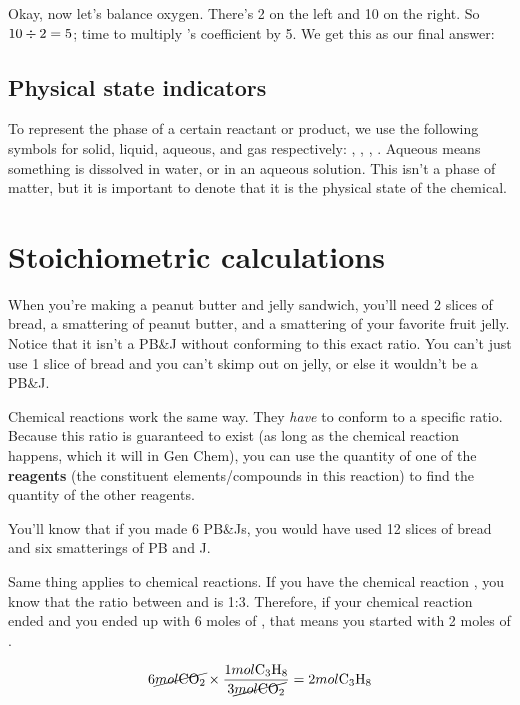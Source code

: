 \documentclass[letterpaper, 12pt]{article}
\begin{document}

Okay, now let's balance oxygen. There's 2 on the left and 10 on the right. So $10 \divisionsymbol 2 = 5$; time to multiply 's coefficient by 5. We get this as our final answer:


	\subsection{Physical state indicators}
	To represent the phase of a certain reactant or product, we use the following symbols for solid, liquid, aqueous, and gas respectively: , , , . Aqueous means something is dissolved in water, or in an aqueous solution. This isn't a phase of matter, but it is important to denote that it is the physical state of the chemical.

\section{Stoichiometric calculations}
When you're making a peanut butter and jelly sandwich, you'll need 2 slices of bread, a smattering of peanut butter, and a smattering of your favorite fruit jelly. Notice that it isn't a PB\&J without conforming to this exact ratio. You can't just use 1 slice of bread and you can't skimp out on jelly, or else it wouldn't be a PB\&J.


Chemical reactions work the same way. They \textit{have} to conform to a specific ratio. Because this ratio is guaranteed to exist (as long as the chemical reaction happens, which it will in Gen Chem), you can use the quantity of one of the \textbf{reagents} (the constituent elements/compounds in this reaction) to find the quantity of the other reagents.

You'll know that if you made 6 PB\&Js, you would have used 12 slices of bread and six smatterings of PB and J.

Same thing applies to chemical reactions. If you have the chemical reaction , you know that the ratio between  and  is 1:3. Therefore, if your chemical reaction ended and you ended up with 6 moles of , that means you started with 2 moles of .

$$6 \cancel{mol \ce{CO2}} \times \frac{1 mol \ce{C3H8}}{3 \cancel{mol \ce{CO2}}} = 2 mol \ce{C3H8}$$
\end{document}
